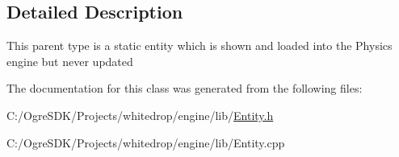\subsection{Detailed Description}
This parent type is a static entity which is shown and loaded into the Physics engine but never updated 

The documentation for this class was generated from the following files\+:\begin{DoxyCompactItemize}
\item 
C\+:/\+Ogre\+S\+D\+K/\+Projects/whitedrop/engine/lib/\hyperlink{_entity_8h}{Entity.\+h}\item 
C\+:/\+Ogre\+S\+D\+K/\+Projects/whitedrop/engine/lib/Entity.\+cpp\end{DoxyCompactItemize}
